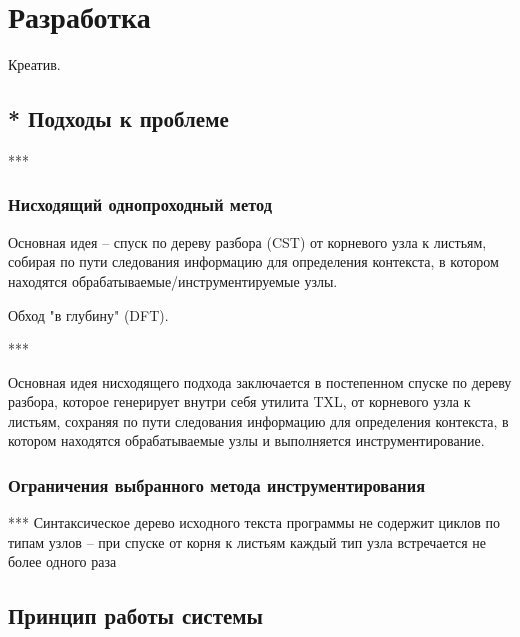 \chapter{Разработка}

Креатив.

\section{* Подходы к проблеме}

***

\subsection{Нисходящий однопроходный метод}

Основная идея -- спуск по дереву разбора (CST) от корневого узла к листьям, собирая по пути следования информацию для определения контекста, в котором находятся обрабатываемые/инструментируемые узлы.

Обход "в глубину" (DFT).

***

Основная идея нисходящего подхода заключается в постепенном спуске по дереву разбора, которое генерирует внутри себя утилита TXL, от корневого узла к листьям, сохраняя по пути следования информацию для определения контекста, в котором находятся обрабатываемые узлы и выполняется инструментирование.

\subsection{Ограничения выбранного метода инструментирования}

***
Синтаксическое дерево исходного текста программы не содержит циклов по типам узлов -- при спуске от корня к листьям каждый тип узла встречается не более одного раза

\section{Принцип работы системы}

